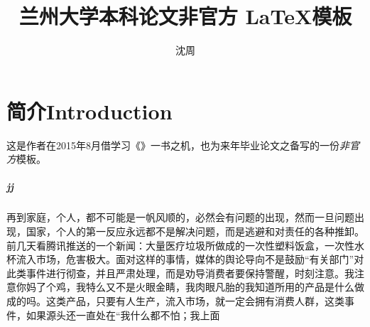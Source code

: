 \documentclass{book}
\title{{兰州大学本科论文非官方 \LaTeX 模板}}
\author{沈周}
\begin{document}
\tableofcontents
\mainmatter
\chapter{简介Introduction}
这是作者在2015年8月借学习《》\hyperref[latextutorial]{\cite{latextutorial}}一书之机，也为来年毕业论文之备写的一份{\it 非官方}模板。
\paragraph{jj}再到家庭，个人，都不可能是一帆风顺的，必然会有问题的出现，然而一旦问题出现，国家，个人的第一反应永远都不是解决问题，而是逃避和对责任的各种推卸。
前几天看腾讯推送的一个新闻：大量医疗垃圾所做成的一次性塑料饭盒，一次性水杯流入市场，危害极大。面对这样的事情，媒体的舆论导向不是鼓励“有关部门”对此类事件进行彻查，并且严肃处理，而是劝导消费者要保持警醒，时刻注意。我注意你妈了个鸡，我特么又不是火眼金睛，我肉眼凡胎的我知道所用的产品是什么做成的吗。这类产品，只要有人生产，流入市场，就一定会拥有消费人群，这类事件，如果源头还一直处在“我什么都不怕；我上面

\backmatter
\printbibliography[title={参考文献},heading=bibintoc]
\end{document}
